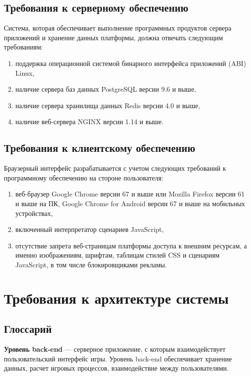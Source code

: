 \documentclass[12pt, a4paper]{article}
\begin{document}
\subsection{Требования к серверному обеспечению}

Система, которая обеспечивает выполнение программных продуктов сервера приложений
и хранение данных платформы, должна отвечать следующим требованиям:

\begin{enumerate}
\item поддержка операционной системой бинарного интерфейса приложений (ABI) Linux,
\item наличие сервера баз данных PostgreSQL версии 9.6 и выше,
\item наличие сервера хранилища данных Redis версии 4.0 и выше,
\item наличие веб-сервера NGINX версии 1.14 и выше.
\end{enumerate}

\subsection{Требования к клиентскому обеспечению}

Браузерный интерфейс разрабатывается с учетом следующих требований к
программному обеспечению на стороне пользователя:

\begin{enumerate}
\item веб-браузер Google Chrome версии 67 и выше или Mozilla Firefox версии 61 и выше
  на ПК, Google Chrome for Android версии 67 и выше на мобильных устройствах,
\item включенный интерпретатор сценариев JavaScript,
\item отсутствие запрета веб-страницам платформы доступа к внешним ресурсам,
а именно изображениям, шрифтам, таблицам стилей CSS и сценариям JavaScript,
в том числе блокировщиками рекламы.
\end{enumerate}

\section{Требования к архитектуре системы}

\subsection{Глоссарий}

\textbf{Уровень back-end} — серверное приложение, с которым взаимодействует
пользовательский интерфейс игры. Уровень back-end обеспечивает хранение данных,
расчет игровых процессов, взаимодействие между пользователями.
\end{document}
